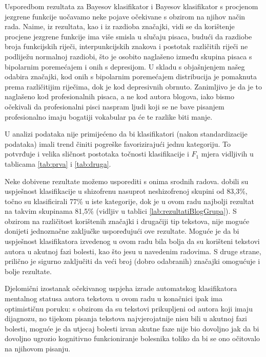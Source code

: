 \documentclass[10pt, a4paper]{article}
\begin{document}
Usporedbom rezultata za Bayesov klasifikator i Bayesov klasifikator s procjenom jezgrene funkcije uočavamo neke pojave očekivane s obzirom na njihov način rada. Naime, iz rezultata, kao i iz razdioba značajki, vidi se da korištenje procjene jezgrene funkcije ima više smisla u slučaju pisaca, budući da razdiobe broja funkcijskih riječi, interpunkcijskih znakova i postotak različitih riječi ne podliježu normalnoj razdiobi, što je osobito naglašeno između skupina pisaca s bipolarnim poremećajem i onih s depresijom. U skladu s objašnjenjem našeg odabira značajki, kod onih s bipolarnim poremećajem distribucija je pomaknuta prema različitijim riječima, dok je kod depresivnih obrnuto. Zanimljivo je da je to naglašeno kod profesionalnih pisaca, a ne kod autora blogova, iako bismo očekivali da profesionalni pisci naspram ljudi koji se ne bave pisanjem profesionalno imaju bogatiji vokabular pa će te razlike biti manje.

U analizi podataka nije primijećeno da bi klasifikatori (nakon standardizacije podataka) imali trend činiti pogreške favorizirajući jednu kategoriju. To potvrđuje i velika sličnost postotaka točnosti klasifikacije i  $F_1$ mjera vidljivih u tablicama \ref{tab:prva} i \ref{tab:druga}.

Neke dobivene rezultate možemo usporediti s onima srodnih radova.  \citet{strous-2009} dobili su uspješnost klasifikacije u shizofrenu nasuprot neshizofrenoj skupini od 83,3\%, \citet{exray} točno su klasificirali 77\% u iste kategorije, dok je u ovom radu najbolji rezultat na takvim skupinama 81,5\% (vidljiv u tablici \ref{lab:rezultatiBlogGrupa}). S obzirom na različitost korištenih značajki i drugačiji tip tekstova, nije moguće donijeti jednoznačne zaključke uspoređujući ove rezultate. Moguće je da bi uspješnost klasifikatora izvedenog u ovom radu bila bolja da su korišteni tekstovi autora u akutnoj fazi bolesti, kao što jesu u navedenim radovima. S druge strane, prilično je sigurno zaključiti da veći broj (dobro odabranih) značajki omogućuje i bolje rezultate.

Djelomični izostanak očekivanog uspjeha izrade automatskog klasifikatora mentalnog statusa autora tekstova u ovom radu u konačnici ipak ima optimističnu poruku: s obzirom da su tekstovi prikupljeni  od autora koji imaju dijagnozu, no tijekom pisanja tekstova najvjerojatnije nisu bili u akutnoj fazi bolesti, moguće je da utjecaj bolesti izvan akutne faze nije bio dovoljno jak da bi dovoljno ugrozio kognitivno funkcioniranje bolesnika toliko da bi se ono očitovalo na njihovom pisanju. 
\end{document}
